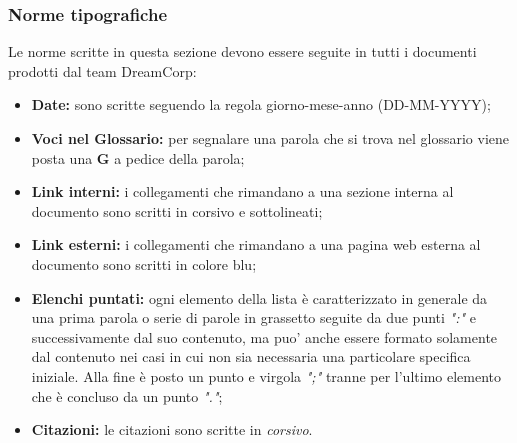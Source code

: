 		\subsubsection{Norme tipografiche}
			Le norme scritte in questa sezione devono essere seguite in tutti i documenti prodotti dal team DreamCorp:
			\begin{itemize}
				\item \textbf{Date:} sono scritte seguendo la regola giorno-mese-anno (DD-MM-YYYY);
				\item \textbf{Voci nel Glossario:} per segnalare una parola che si trova nel glossario viene posta una \textbf{G} a pedice della parola;
				\item \textbf{Link interni:} i collegamenti che rimandano a una sezione interna al documento sono scritti in corsivo e sottolineati;
				\item \textbf{Link esterni:} i collegamenti che rimandano a una pagina web esterna al documento sono scritti in colore blu;
				\item \textbf{Elenchi puntati:} ogni elemento della lista è caratterizzato in generale da una prima parola o serie di parole in grassetto seguite da due punti \textit{":"} e successivamente dal suo contenuto, ma puo' anche essere formato solamente dal contenuto nei casi in cui non sia necessaria una particolare specifica iniziale. Alla fine è posto un punto e virgola \textit{";"} tranne per l'ultimo elemento che è concluso da un punto \textit{"."};
				\item \textbf{Citazioni:} le citazioni sono scritte in \textit{corsivo}.
			\end{itemize}

